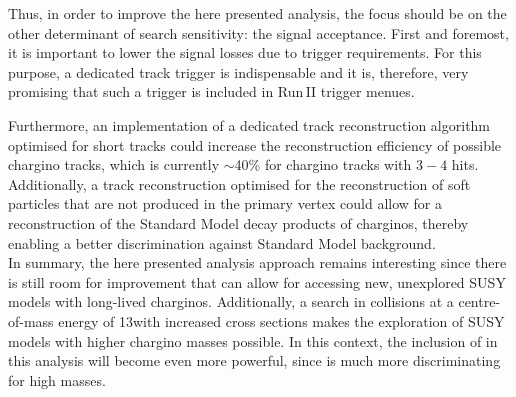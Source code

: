 Thus, in order to improve the here presented analysis, the focus should be on the other determinant of search sensitivity: the signal acceptance.
First and foremost, it is important to lower the signal losses due to trigger requirements.
For this purpose, a dedicated track trigger is indispensable and it is, therefore, very promising that such a trigger is included in Run\,II trigger menues.

Furthermore, an implementation of a dedicated track reconstruction algorithm optimised for short tracks could increase the reconstruction efficiency of possible chargino tracks, which is currently $\sim$40\% for chargino tracks with $3-4$ hits.
Additionally, a track reconstruction optimised for the reconstruction of soft particles that are not produced in the primary vertex could allow for a reconstruction of the Standard Model decay products of charginos, thereby enabling a better discrimination against Standard Model background.\\


In summary, the here presented analysis approach remains interesting since there is still room for improvement that can allow for accessing new, unexplored SUSY models with long-lived charginos.
Additionally, a search in collisions at a centre-of-mass energy of 13\tev with increased cross sections makes the exploration of SUSY models with higher chargino masses possible.
In this context, the inclusion of \dedx in this analysis will become even more powerful, since \dedx is much more discriminating for high masses.






